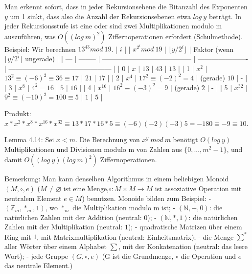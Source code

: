 \documentclass[a4paper]{article}
\begin{document}
\begin{multicols}{3}
    Man erkennt sofort, dass in jeder Rekursionsebene die Bitanzahl des Exponenten $y$ um 1 sinkt, dass also die Anzahl der Rekursionsebenen etwa $log\ y$ beträgt. In jeder Rekursionsstufe ist eine oder sind zwei Multiplikationen modulo m auszuführen, was $O((log\ m)^2)$ Ziffernoperationen erfordert (Schulmethode).
    Beispiel: Wir berechnen $13^{43} mod\ 19$.
    | $i$ |          | $x^{2^i} mod\ 19$                       | $\lfloor y/2^i\rfloor$ | Faktor (wenn $\lfloor y/2^i\rfloor$ ungerade) |
    | --- | -------- | --------------------------------------- | ---------------------- | --------------------------------------------- |
    | 0   | $x$      | $13$                                    | $43$                   | $13$                                          |
    | 1   | $x^2$    | $13^2 \equiv (-6)^2 \equiv 36\equiv 17$ | $21$                   | $17$                                          |
    | 2   | $x^4$    | $17^2 \equiv (-2)^2 = 4$                | (gerade) $10$          | -                                             |
    | 3   | $x^8$    | $4^2 = 16$                              | $5$                    | $16$                                          |
    | 4   | $x^{16}$ | $16^2 \equiv (-3)^2 = 9$                | (gerade) $2$           | -                                             |
    | 5   | $x^{32}$ | $9^2 \equiv (-10)^2 = 100\equiv 5$      | $1$                    | $5$                                           |

    Produkt: $x*x^2 *x^8 *x^{16} *x^{32} \equiv 13*17*16*5\equiv (-6)(-2)(-3)5 = -180\equiv -9\equiv 10$.

    Lemma 4.14: Sei $x<m$. Die Berechnung von $x^y\ mod\ m$ benötigt $O(log\ y)$ Multiplikationen und Divisionen modulo m von Zahlen aus $\{0,...,m^2-1\}$, und damit $O((log\ y)(log\ m)^2)$ Ziffernoperationen.

    Bemerkung: Man kann denselben Algorithmus in einem beliebigen Monoid $(M,\circ,e)$ ($M\not=\varnothing$ ist eine Menge,$\circ:M\times M \rightarrow M$ ist assoziative Operation mit neutralem Element $e\in M$) benutzen. Monoide bilden zum Beispiel:
    - $(\mathbb{Z}_m ,*_m,1)$, wo $*_m$ die Multiplikation modulo m ist;
    - $(\mathbb{N},+,0)$: die natürlichen Zahlen mit der Addition (neutral: $0$);
    - $(\mathbb{N},*,1)$: die natürlichen Zahlen mit der Multiplikation (neutral: $1$);
    - quadratische Matrizen über einem Ring mit $1$, mit Matrixmultiplikation (neutral: Einheitsmatrix);
    - die Menge $\sum^*$ aller Wörter über einem Alphabet $\sum$, mit der Konkatenation (neutral: das leere Wort);
    - jede Gruppe $(G,\circ,e)$ (G ist die Grundmenge, $\circ$ die Operation und $e$ das neutrale Element.)


\end{multicols}
\end{document}
